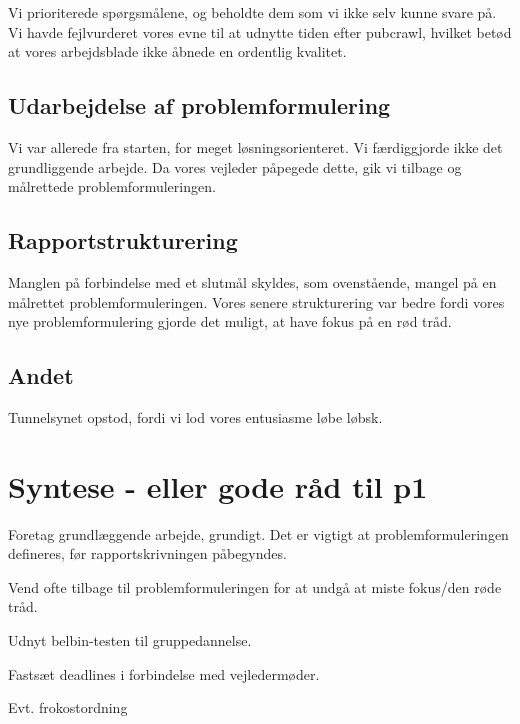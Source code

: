 Vi prioriterede spørgsmålene, og beholdte dem som vi ikke selv kunne svare på. Vi havde fejlvurderet vores evne til at udnytte tiden efter pubcrawl, hvilket betød at vores arbejdsblade ikke åbnede en ordentlig kvalitet.

\subsection{Udarbejdelse af problemformulering}

Vi var allerede fra starten, for meget løsningsorienteret. Vi færdiggjorde ikke det grundliggende arbejde. Da vores vejleder påpegede dette, gik vi tilbage og målrettede problemformuleringen.

\subsection{Rapportstrukturering}

Manglen på forbindelse med et slutmål skyldes, som ovenstående, mangel på en målrettet problemformuleringen. Vores senere strukturering var bedre fordi vores nye problemformulering gjorde det muligt, at have fokus på en rød tråd.

\subsection{Andet}

Tunnelsynet opstod, fordi vi lod vores entusiasme løbe løbsk.




\section{Syntese - eller gode råd til p1}


Foretag grundlæggende arbejde, grundigt. Det er vigtigt at problemformuleringen defineres, før rapportskrivningen påbegyndes. 

Vend ofte tilbage til problemformuleringen for at undgå at miste fokus/den røde tråd.

Udnyt belbin-testen til gruppedannelse. 

Fastsæt deadlines i forbindelse med vejledermøder.

Evt. frokostordning

